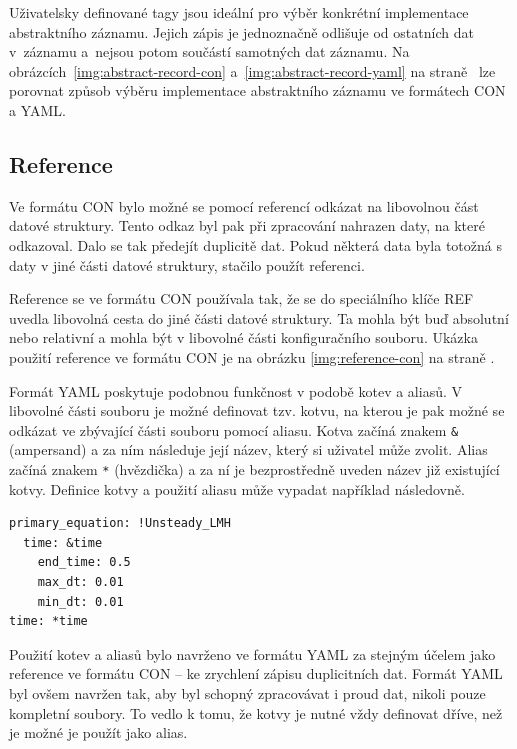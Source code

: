 \documentclass[FM,bw,DP]{tulthesis}
\begin{document}
Uživatelsky definované tagy jsou ideální pro výběr konkrétní implementace abstraktního záznamu. Jejich zápis je jednoznačně odlišuje od ostatních dat v~záznamu a~nejsou potom součástí samotných dat záznamu. Na obrázcích~\ref{img:abstract-record-con} a~\ref{img:abstract-record-yaml} na straně~\pageref{img:abstract-record-con} lze porovnat způsob výběru implementace abstraktního záznamu ve formátech \gls{CON} a \gls{YAML}.


\subsection{Reference}

Ve formátu CON bylo možné se pomocí referencí odkázat na libovolnou část datové struktury. Tento odkaz byl pak při zpracování nahrazen daty, na které odkazoval. Dalo se tak předejít duplicitě dat. Pokud některá data byla totožná s daty v jiné části datové struktury, stačilo použít referenci.

Reference se ve formátu CON používala tak, že se do speciálního klíče REF uvedla libovolná cesta do jiné části datové struktury. Ta mohla být buď absolutní nebo relativní a mohla být v libovolné části konfiguračního souboru. Ukázka použití reference ve formátu CON je na obrázku \ref{img:reference-con} na straně \pageref{img:reference-con}.

Formát YAML poskytuje podobnou funkčnost v podobě kotev a aliasů. V libovolné části souboru je možné definovat tzv. kotvu, na kterou je pak možné se odkázat ve zbývající části souboru pomocí aliasu. Kotva začíná znakem \texttt{\&} (ampersand) a za ním následuje její název, který si uživatel může zvolit. Alias začíná znakem \texttt{*} (hvězdička) a za ní je bezprostředně uveden název již existující kotvy. Definice kotvy a použití aliasu může vypadat například následovně.

\vspace{5pt}
\begin{lstlisting}
primary_equation: !Unsteady_LMH
  time: &time
    end_time: 0.5
    max_dt: 0.01
    min_dt: 0.01
time: *time
\end{lstlisting}
\vspace{-20pt}

Použití kotev a aliasů bylo navrženo ve formátu YAML za stejným účelem jako reference ve formátu CON -- ke zrychlení zápisu duplicitních dat. Formát YAML byl ovšem navržen tak, aby byl schopný zpracovávat i proud dat, nikoli pouze kompletní soubory. To vedlo k tomu, že kotvy je nutné vždy definovat dříve, než je možné je použít jako alias.
\end{document}

